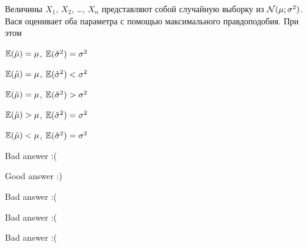 
\begin{question}
Величины \(X_1\), \(X_2\), \ldots, \(X_n\) представляют собой случайную
выборку из \(\mathcal{N}(\mu; \sigma^2)\). Вася оценивает оба параметра с
помощью максимального правдоподобия. При этом
\begin{answerlist}
  \item \(\operatorname{\mathbb{E}}(\hat \mu)=\mu\), \(\operatorname{\mathbb{E}}(\hat\sigma^2) = \sigma^2\)
  \item \(\operatorname{\mathbb{E}}(\hat \mu)=\mu\), \(\operatorname{\mathbb{E}}(\hat\sigma^2) < \sigma^2\)
  \item \(\operatorname{\mathbb{E}}(\hat \mu)=\mu\), \(\operatorname{\mathbb{E}}(\hat\sigma^2) > \sigma^2\)
  \item \(\operatorname{\mathbb{E}}(\hat \mu)>\mu\), \(\operatorname{\mathbb{E}}(\hat\sigma^2) = \sigma^2\)
  \item \(\operatorname{\mathbb{E}}(\hat \mu)<\mu\), \(\operatorname{\mathbb{E}}(\hat\sigma^2) = \sigma^2\)
\end{answerlist}
\end{question}

\begin{solution}
\begin{answerlist}
  \item Bad answer :(
  \item Good answer :)
  \item Bad answer :(
  \item Bad answer :(
  \item Bad answer :(
\end{answerlist}
\end{solution}

